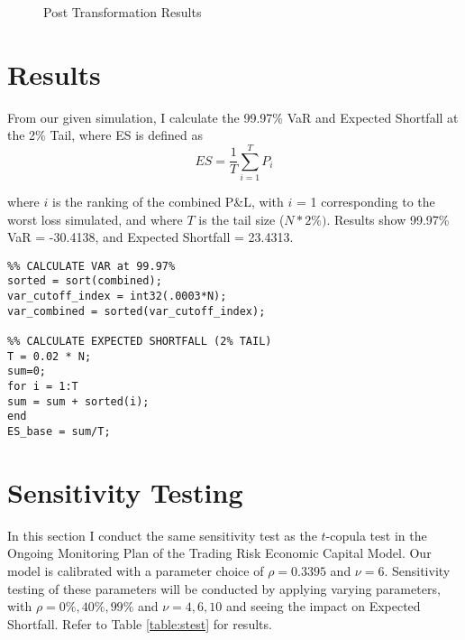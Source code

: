 \documentclass[titlepage]{article}
\begin{document}
\begin{figure}
	\centering
	\qquad
	\caption{Post Transformation Results}
	\label{fig:trans}
	
\end{figure}

\section{Results}
From our given simulation, I calculate the 99.97\% VaR and Expected Shortfall at the 2\% Tail, where ES is defined as 
\begin{equation}
ES = \frac{1}{T} \sum_{i=1}^{T} P_{i}
\end{equation}

where $i$ is the ranking of the combined P\&L, with $i$ = 1 corresponding to the worst loss simulated, and where $T$ is the tail size ($N*2\%).$ Results show 99.97\% VaR = -30.4138, and Expected Shortfall = 23.4313.

\begin{verbatim}
%% CALCULATE VAR at 99.97%
sorted = sort(combined);
var_cutoff_index = int32(.0003*N);
var_combined = sorted(var_cutoff_index);

%% CALCULATE EXPECTED SHORTFALL (2% TAIL)
T = 0.02 * N;
sum=0;
for i = 1:T
sum = sum + sorted(i);
end
ES_base = sum/T;
\end{verbatim}


\section{Sensitivity Testing}
	In this section I conduct the same sensitivity test as the $t$-copula test in the Ongoing Monitoring Plan of the Trading Risk Economic Capital Model. Our model is calibrated with a parameter choice of $\rho = 0.3395$ and $\nu=6$. Sensitivity testing of these parameters will be conducted by applying varying parameters, with $\rho = 0\%, 40\%, 99\%$ and $\nu = 4, 6, 10$ and seeing the impact on Expected Shortfall. Refer to Table \ref{table:stest} for results.
	
\end{document}
